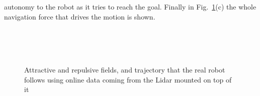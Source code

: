 \documentclass[conference]{IEEEtran}
\begin{document}
autonomy to the robot as it tries to reach the goal. Finally in
Fig.~\ref{f:kbki_lidar}(c) the whole navigation force that drives the motion is
shown.

\begin{figure}
  \centering
  \\
  \\
  \\
  \captionsetup{font=footnotesize}
  \caption{Attractive and repulsive fields, and trajectory that the real robot
    follows using online data coming from the Lidar mounted on top of it} \label{f:kbki_lidar}
\end{figure}
\end{document}
